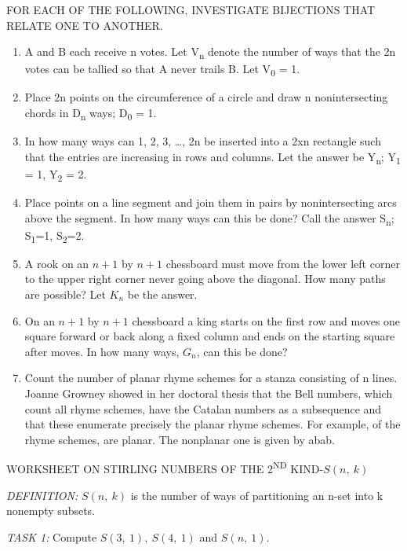 FOR EACH OF THE FOLLOWING, INVESTIGATE BIJECTIONS THAT RELATE ONE TO
ANOTHER.
\begin{enumerate}
\def\labelenumi{\arabic{enumi}.}

\item
  A and B each receive n votes. Let V\textsubscript{n} denote the number
  of ways that the 2n votes can be tallied so that A never trails B. Let
  V\textsubscript{0} = 1.
\item
  Place 2n points on the circumference of a circle and draw n
  nonintersecting chords in D\textsubscript{n} ways; D\textsubscript{0}
  = 1.
\item
  In how many ways can 1, 2, 3, \ldots{}, 2n be inserted into a 2xn
  rectangle such that the entries are increasing in rows and columns.
  Let the answer be Y\textsubscript{n}; Y\textsubscript{1} = 1,
  Y\textsubscript{2} = 2.
\item
  Place points on a line segment and join them in pairs by
  nonintersecting arcs above the segment. In how many ways can this be
  done? Call the answer S\textsubscript{n}; S\textsubscript{1}=1,
  S\textsubscript{2}=2.
\item
  A rook on an \(n + 1\) by \(n + 1\) chessboard must move from the
  lower left corner to the upper right corner never going above the
  diagonal. How many paths are possible? Let \(K_{n}\) be the answer.
\item
  On an \(n + 1\) by \(n + 1\) chessboard a king starts on the first row
  and moves one square forward or back along a fixed column and ends on
  the starting square after moves. In how many ways, \(G_{n}\), can this
  be done?
\item
  Count the number of planar rhyme schemes for a stanza consisting of n
  lines. Joanne Growney showed in her doctoral thesis that the Bell
  numbers, which count all rhyme schemes, have the Catalan numbers as a
  subsequence and that these enumerate precisely the planar rhyme
  schemes. For example, of the rhyme schemes, are planar. The nonplanar
  one is given by abab.

\end{enumerate}

WORKSHEET ON STIRLING NUMBERS OF THE 2\textsuperscript{ND}
KIND-\(S(n,\ k)\)

\emph{DEFINITION:} \(S\left( n,\ k \right)\) is the number of ways of
partitioning an n-set into k nonempty subsets.

\emph{TASK 1:} Compute \(S\left( 3,\ 1 \right),\ S(4,\ 1)\) and
\(S(n,\ 1)\).

